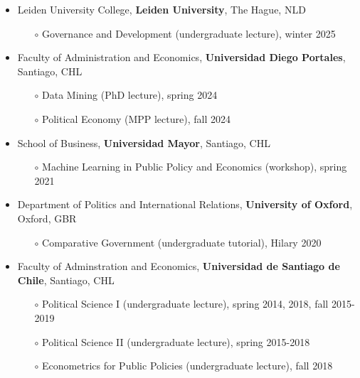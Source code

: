 \begin{publications}

\begin{itemize}
\item{\small Leiden University College, {\bfseries Leiden University}, The Hague, NLD}
\begin{itemize}
\item[$\circ$]{\small Governance and Development (undergraduate lecture), winter 2025}
\end{itemize}
\item{\small Faculty of Administration and Economics, {\bfseries Universidad Diego Portales}, Santiago, CHL}
\begin{itemize}
\item[$\circ$]{\small Data Mining (PhD lecture), spring 2024}
\item[$\circ$]{\small Political Economy (MPP lecture), fall 2024}
\end{itemize}
\item{\small School of Business, {\bfseries Universidad Mayor}, Santiago, CHL}
\begin{itemize}
\item[$\circ$]{\small Machine Learning in Public Policy and Economics (workshop), spring 2021}
\end{itemize}
\item{\small Department of Politics and International Relations, {\bfseries University of Oxford}, Oxford, GBR}
\begin{itemize}
\item[$\circ$]{\small Comparative Government (undergraduate tutorial), Hilary 2020}
\end{itemize}
\item{\small Faculty of Adminstration and Economics, {\bfseries Universidad de Santiago de Chile}, Santiago, CHL}
\begin{itemize}
\item[$\circ$]{\small Political Science I (undergraduate lecture), spring 2014, 2018, fall 2015-2019}
\item[$\circ$]{\small Political Science II (undergraduate lecture), spring 2015-2018}
\item[$\circ$]{\small Econometrics for Public Policies (undergraduate lecture), fall 2018}

\end{itemize}
\end{itemize}
\end{publications}
